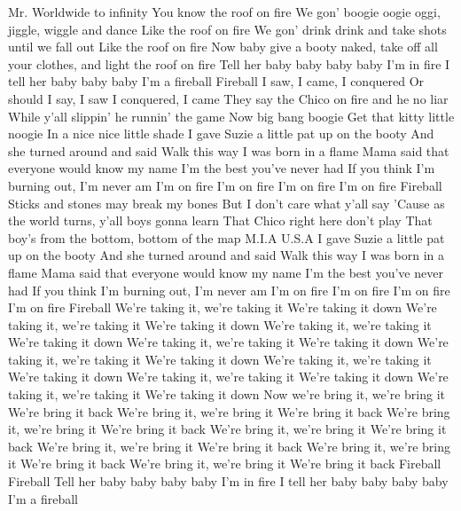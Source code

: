 Mr. Worldwide to infinity
You know the roof on fire
We gon' boogie oogie oggi, jiggle, wiggle and dance
Like the roof on fire
We gon' drink drink and take shots until we fall out
Like the roof on fire
Now baby give a booty naked, take off all your clothes,
and light the roof on fire
Tell her baby baby baby baby
I'm in fire
I tell her baby baby baby
I'm a fireball
Fireball
I saw, I came, I conquered
Or should I say, I saw I conquered, I came
They say the Chico on fire and he no liar
While y'all slippin’ he runnin’ the game
Now big bang boogie
Get that kitty little noogie
In a nice nice little shade
I gave Suzie a little pat up on the booty
And she turned around and said
Walk this way
I was born in a flame
Mama said that everyone would know my name
I'm the best you've never had
If you think I'm burning out, I'm never am
I'm on fire
I'm on fire
I'm on fire
I'm on fire
Fireball
Sticks and stones may break my bones
But I don’t care what y’all say
'Cause as the world turns, y’all boys gonna learn
That Chico right here don’t play
That boy’s from the bottom, bottom of the map
M.I.A U.S.A
I gave Suzie a little pat up on the booty
And she turned around and said
Walk this way
I was born in a flame
Mama said that everyone would know my name
I'm the best you've never had
If you think I'm burning out, I'm never am
I'm on fire
I'm on fire
I'm on fire
I'm on fire
Fireball
We're taking it, we're taking it
We're taking it down
We're taking it, we're taking it
We're taking it down
We're taking it, we're taking it
We're taking it down
We're taking it, we're taking it
We're taking it down
We're taking it, we're taking it
We're taking it down
We're taking it, we're taking it
We're taking it down
We're taking it, we're taking it
We're taking it down
We're taking it, we're taking it
We're taking it down
Now we're bring it, we're bring it
We're bring it back
We're bring it, we're bring it
We're bring it back
We're bring it, we're bring it
We're bring it back
We're bring it, we're bring it
We're bring it back
We're bring it, we're bring it
We're bring it back
We're bring it, we're bring it
We're bring it back
We're bring it, we're bring it
We're bring it back
Fireball
Fireball
Tell her baby baby baby baby
I'm in fire
I tell her baby baby baby baby
I'm a fireball